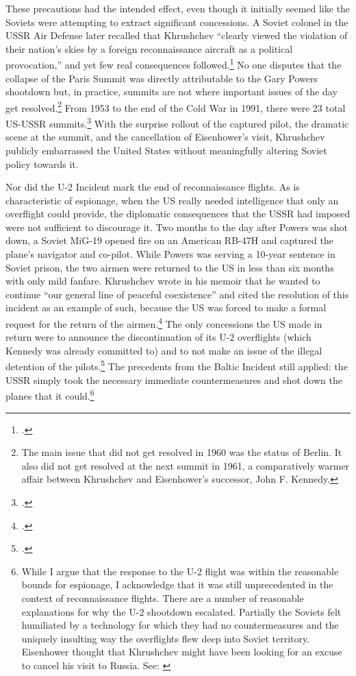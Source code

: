 \documentclass[12pt]{extarticle}
\begin{document}
These precautions had the intended effect, even though it initially seemed like the Soviets were attempting to extract significant concessions. A Soviet colonel in the USSR Air Defense later recalled that Khrushchev ``clearly viewed the violation of their nation's skies by a foreign reconnaissance aircraft \textelp{} as a political provocation,'' and yet few real consequences followed.\footcite{orlov_u-2_2007} No one disputes that the collapse of the Paris Summit was directly attributable to the Gary Powers shootdown but, in practice, summits are not where important issues of the day get resolved.\footnote{The main issue that did not get resolved in 1960 was the status of Berlin. It also did not get resolved at the next summit in 1961, a comparatively warmer affair between Khrushchev and Eisenhower's successor, John F. Kennedy.} From 1953 to the end of the Cold War in 1991, there were 23 total US-USSR summits.\footcite{fain_chronology_2011} With the surprise rollout of the captured pilot, the dramatic scene at the summit, and the cancellation of Eisenhower's visit, Khrushchev publicly embarrassed the United States without meaningfully altering Soviet policy towards it.

Nor did the U-2 Incident mark the end of reconnaissance flights. As is characteristic of espionage, when the US really needed intelligence that only an overflight could provide, the diplomatic consequences that the USSR had imposed were not sufficient to discourage it. Two months to the day after Powers was shot down, a Soviet MiG-19 opened fire on an American RB-47H and captured the plane's navigator and co-pilot. While Powers was serving a 10-year sentence in Soviet prison, the two airmen were returned to the US in less than six months with only mild fanfare. Khrushchev wrote in his memoir that he wanted to continue \enquote{our general line of peaceful coexistence} and cited the resolution of this incident as an example of such, because the US was forced to make a formal request for the return of the airmen.\footcite[256-257]{khrushchev_memoirs_2007} The only concessions the US made in return were to announce the discontinuation of its U-2 overflights (which Kennedy was already committed to) and to not make an issue of the illegal detention of the pilots.\footcite{time_cold_1961} The precedents from the Baltic Incident still applied: the USSR simply took the necessary immediate countermeasures and shot down the planes that it could.\footnote{While I argue that the response to the U-2 flight was within the reasonable bounds for espionage, I acknowledge that it was still unprecedented in the context of reconnaissance flights. There are a number of reasonable explanations for why the U-2 shootdown escalated. Partially the Soviets felt humiliated by a technology for which they had no countermeasures and the uniquely insulting way the overflights flew deep into Soviet territory. Eisenhower thought that Khrushchev might have been looking for an excuse to cancel his visit to Russia. See: \cite[555]{eisenhower_waging_1965}}
\end{document}
